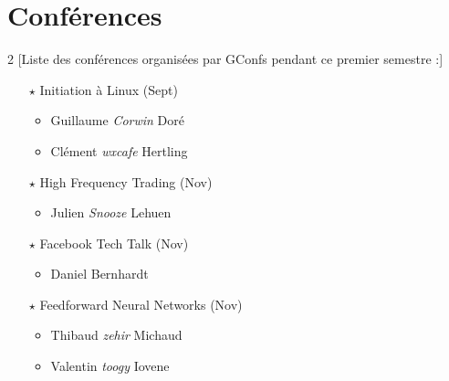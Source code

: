 \documentclass[a4paper]{article}
\title{\mytitle}
\author{toogy}
\begin{document}
\maketitle

\section{Conférences}

\begin{multicols*}{2}
    [Liste des conférences organisées par GConfs pendant ce premier semestre :]

    \begin{itemize}
        \item[$\star$] Initiation à Linux (Sept)
            \begin{itemize}
                \item Guillaume \emph{Corwin} Doré
                \item Clément \emph{wxcafe} Hertling
            \end{itemize}

            \vspace{0.3cm}

        \item[$\star$] High Frequency Trading (Nov)
            \begin{itemize}
                \item Julien \emph{Snooze} Lehuen
            \end{itemize}

            \vspace{0.3cm}

        \item[$\star$] Facebook Tech Talk (Nov)
            \begin{itemize}
                \item Daniel Bernhardt
            \end{itemize}

            \vspace{0.3cm}

        \item[$\star$] Feedforward Neural Networks (Nov)
            \begin{itemize}
                \item Thibaud \emph{zehir} Michaud
                \item Valentin \emph{toogy} Iovene
            \end{itemize}


\end{itemize}
\end{multicols*}
\end{document}
